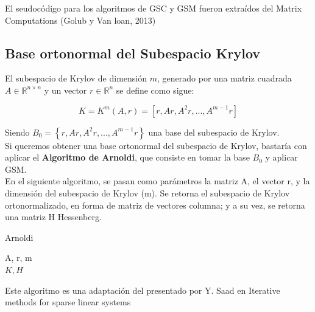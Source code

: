 \documentclass{endm}
\begin{document}
El seudoc\'odigo para los algoritmos de GSC y GSM fueron extra\'idos del Matrix Computations (Golub y Van loan, 2013)\cite{matrixcomp}

\subsection{Base ortonormal del Subespacio Krylov}

El subespacio de Krylov de dimensi\'on $m$, generado por una matriz cuadrada $A \in \mathbb{R}^{n \times n}$ y un vector $r \in \mathbb{R}^{n}$ se define como sigue:

\begin{equation*}
    K = K^m (A, r) = \left[r, Ar, A^{2}r, ..., A^{m-1}r \right]
\end{equation*}

Siendo $B_0 = \left\lbrace r, Ar, A^{2}r, ..., A^{m-1}r \right\rbrace$ una base del subespacio de Krylov.\\

Si queremos obtener una base ortonormal del subespacio de Krylov, bastar\'ia con aplicar el \textbf{Algoritmo de Arnoldi}, que consiste en tomar la base $B_0$ y aplicar GSM.\\

En el siguiente algoritmo, se pasan como par\'ametros la matriz A, el vector r, y la dimensi\'on del subespacio de Krylov (m). Se retorna el subespacio de Krylov ortonormalizado, en forma de matriz de vectores columna; y a su vez, se retorna una matriz H Hessenberg.

\begin{algorithm}[H] 
\caption{Arnoldi}
\small
\centering
\begin{algorithmic}[1]
\Require A, r, m 
        \EndFor
        \EndIf
        \EndIf
    \EndFor\\
    \Return $K, H$ 
\end{algorithmic}
\end{algorithm}
Este algoritmo es una adaptación del presentado por Y. Saad en Iterative methods for sparse linear systems\cite{itermethods}
\end{document}
